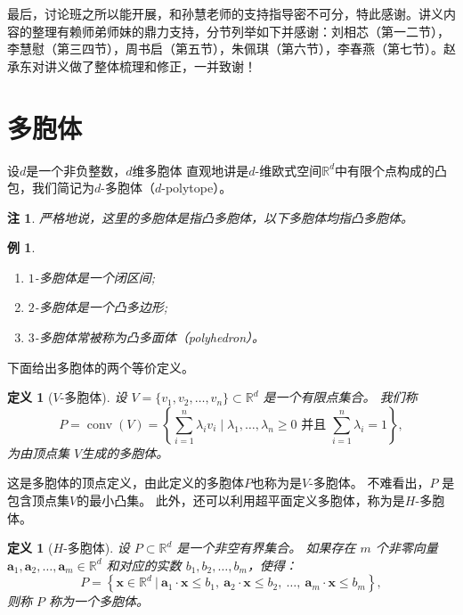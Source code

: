 \documentclass[12pt,a4paper]{ctexbook} %
\newcounter{theorem}[section]
\newtheorem{definition}[theorem]{定义}
\newtheorem{example}[theorem]{例}
\newtheorem{remark}[theorem]{注}
\numberwithin{figure}{section}
\theoremstyle{problemstyle}
\numberwithin{equation}{section} %
\begin{document}
最后，讨论班之所以能开展，和孙慧老师的支持指导密不可分，特此感谢。讲义内容的整理有赖师弟师妹的鼎力支持，分节列举如下并感谢：刘相芯（第一二节），李慧慰（第三四节），周书启（第五节），朱佩琪（第六节），李春燕（第七节）。赵承东对讲义做了整体梳理和修正，一并致谢！

\section{多胞体}
设$d$是一个非负整数，$d$维多胞体
直观地讲是$d$-维欧式空间$\mathbb{R}^d$中有限个点构成的凸包，我们简记为$d$-多胞体（$d$-polytope）。
\begin{remark}
    严格地说，这里的多胞体是指凸多胞体，以下多胞体均指凸多胞体。
\end{remark}
\begin{example}
\begin{enumerate}
    \item $1$-多胞体是一个闭区间;
    \item $2$-多胞体是一个凸多边形;
    \item $3$-多胞体常被称为凸多面体（polyhedron）。
\end{enumerate}
\end{example}

下面给出多胞体的两个等价定义。

\begin{definition}[$V$-多胞体]
\label{polytopedf1}
设 \( V = \{v_1, v_2, \dots, v_n\} \subset \mathbb{R}^d \)  是一个有限点集合。
我们称
\[
P = \operatorname{conv}(V) = \left\{ \sum_{i=1}^{n} \lambda_i v_i \mid 
\lambda_1,\ldots,\lambda_n \geq 0 \,\, \text{并且} \,\, \sum_{i=1}^{n} \lambda_i = 1 \right\},
\]
为由顶点集 \( V \)生成的多胞体。
\end{definition}

这是多胞体的顶点定义，由此定义的多胞体$P$也称为是$V$-多胞体。
不难看出，$P$ 是包含顶点集$V$的最小凸集。
此外，还可以利用超平面定义多胞体，称为是$H$-多胞体。

\begin{definition}[$H$-多胞体]
\label{polytopedf2}
设 $P\subset \mathbb{R}^d$ 是一个非空有界集合。
如果存在 \( m \) 个非零向量 \( \mathbf{a}_1, \mathbf{a}_2, \dots, \mathbf{a}_m \in \mathbb{R}^d \) 和对应的实数 \( b_1, b_2, \dots, b_m \)，使得：  
\[
P = \left\{ \mathbf{x} \in \mathbb{R}^d \ \bigg| \ \mathbf{a}_1 \cdot \mathbf{x} \leq b_1,\ \mathbf{a}_2 \cdot \mathbf{x} \leq b_2,\ \dots,\ \mathbf{a}_m \cdot \mathbf{x} \leq b_m \right\},
\]  
则称 \( P \) 称为一个多胞体。
\end{definition}
\end{document}
